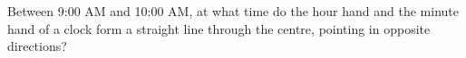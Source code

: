 Between 9:00 AM and 10:00 AM, at what time do the hour hand and the minute hand of a clock form a straight line through the centre, pointing in opposite directions?
